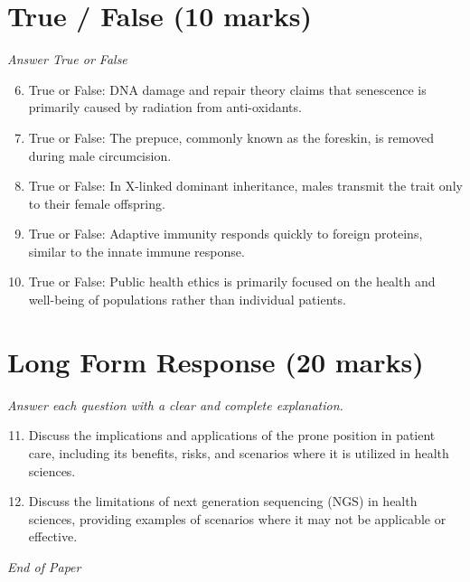 \documentclass[12pt]{article}
\begin{document}
\section*{True / False (10 marks)}
\textit{Answer True or False}
\begin{enumerate}[label=\arabic*.]
\setcounter{enumi}{5}
\item True or False: DNA damage and repair theory claims that senescence is primarily caused by radiation from anti-oxidants.
\item True or False: The prepuce, commonly known as the foreskin, is removed during male circumcision.
\item True or False: In X-linked dominant inheritance, males transmit the trait only to their female offspring.
\item True or False: Adaptive immunity responds quickly to foreign proteins, similar to the innate immune response.
\item True or False: Public health ethics is primarily focused on the health and well-being of populations rather than individual patients.
\end{enumerate}

\section*{Long Form Response (20 marks)}
\textit{Answer each question with a clear and complete explanation.}
\begin{enumerate}[label=\arabic*.]
\setcounter{enumi}{10}
\item Discuss the implications and applications of the prone position in patient care, including its benefits, risks, and scenarios where it is utilized in health sciences.
\item Discuss the limitations of next generation sequencing (NGS) in health sciences, providing examples of scenarios where it may not be applicable or effective.
\end{enumerate}

\vfill
\noindent\textit{End of Paper}
\end{document}
